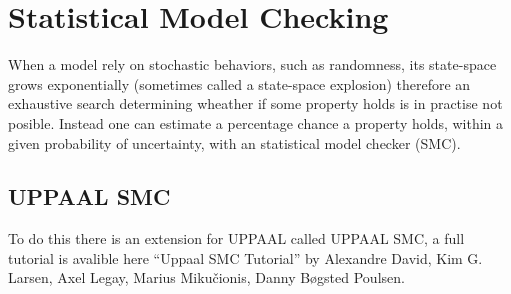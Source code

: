 \section{Statistical Model Checking}

When a model rely on stochastic behaviors, such as randomness, its state-space grows exponentially (sometimes called a state-space explosion) therefore an exhaustive search determining wheather if some property holds is in practise not posible. 
Instead one can estimate a percentage chance a property holds, within a given probability of uncertainty, with an statistical model checker (SMC). 
\subsection{UPPAAL SMC}
To do this there is an extension for UPPAAL called UPPAAL SMC, a full tutorial is avalible here ``Uppaal SMC Tutorial''\cite{DBLP:journals/sttt/DavidLLMP15} by Alexandre David, Kim G. Larsen, Axel Legay, Marius Miku\v{c}ionis, Danny B\o gsted Poulsen.





